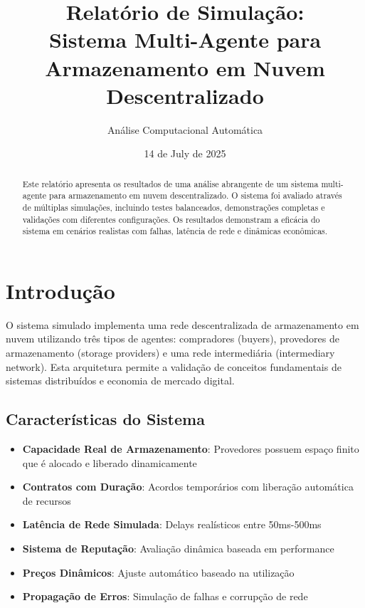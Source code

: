 \documentclass[12pt,a4paper]{article}
\title{Relatório de Simulação: \\ Sistema Multi-Agente para Armazenamento em Nuvem Descentralizado}
\author{Análise Computacional Automática}
\date{14 de July de 2025}
\begin{document}
\maketitle

\begin{abstract}
Este relatório apresenta os resultados de uma análise abrangente de um sistema multi-agente para armazenamento em nuvem descentralizado. O sistema foi avaliado através de múltiplas simulações, incluindo testes balanceados, demonstrações completas e validações com diferentes configurações. Os resultados demonstram a eficácia do sistema em cenários realistas com falhas, latência de rede e dinâmicas econômicas.
\end{abstract}

\tableofcontents
\newpage

\section{Introdução}

O sistema simulado implementa uma rede descentralizada de armazenamento em nuvem utilizando três tipos de agentes: compradores (buyers), provedores de armazenamento (storage providers) e uma rede intermediária (intermediary network). Esta arquitetura permite a validação de conceitos fundamentais de sistemas distribuídos e economia de mercado digital.

\subsection{Características do Sistema}

\begin{itemize}
    \item \textbf{Capacidade Real de Armazenamento}: Provedores possuem espaço finito que é alocado e liberado dinamicamente
    \item \textbf{Contratos com Duração}: Acordos temporários com liberação automática de recursos
    \item \textbf{Latência de Rede Simulada}: Delays realísticos entre 50ms-500ms
    \item \textbf{Sistema de Reputação}: Avaliação dinâmica baseada em performance
    \item \textbf{Preços Dinâmicos}: Ajuste automático baseado na utilização
    \item \textbf{Propagação de Erros}: Simulação de falhas e corrupção de rede
\end{itemize}
\end{document}
